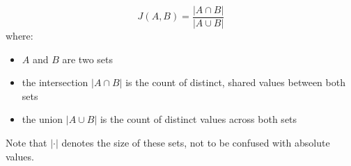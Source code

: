 \documentclass[preview]{standalone}
\begin{document}
{\large
\[
J(A,B)=\frac{|A\cap B|}{|A\cup B|}
\]
}
where:
\begin{itemize}
	\setlength\itemsep{0.1em}
	\item $A$ and $B$ are two sets
	\item the intersection $|A\cap B|$ is the count of distinct, shared values between both sets
	\item the union $|A\cup B|$ is the count of distinct values across both sets
\end{itemize}
Note that $|\cdot |$ denotes the size of these sets, not to be confused with absolute values.
\end{document}
